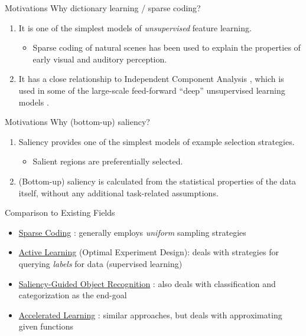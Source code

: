 \documentclass{beamer}
\begin{document}
\begin{frame}{Motivations}
Why dictionary learning / sparse coding?

\begin{enumerate}
	\item It is one of the simplest models of \emph{unsupervised} feature learning.
\begin{itemize}
	\item Sparse coding of natural scenes has been used to explain the properties of early visual \citep{Olshausen:1996p2797} and auditory \citep{Lewicki:2002p1732} perception.
\end{itemize}

	\item It has a close relationship to Independent Component Analysis \citep{Olshausen:1996p2797}, which is used in some of the large-scale feed-forward ``deep'' unsupervised learning models \citep{Le:2011td}.
\end{enumerate}

\end{frame}

\begin{frame}{Motivations}
Why (bottom-up) saliency?

\begin{enumerate}
	\item Saliency provides one of the simplest models of example selection strategies.

	\begin{itemize}
	\item Salient regions are preferentially selected.
\end{itemize}

	\item (Bottom-up) saliency is calculated from the statistical properties of the data itself, without any additional task-related assumptions.
\end{enumerate}
\end{frame}

\begin{frame}{Comparison to Existing Fields}

\begin{itemize}

	\item \underline{Sparse Coding} \citep{Olshausen:1996p2797,Lewicki:2002p1732}: generally employs \emph{uniform} sampling strategies

	\item \underline{Active Learning} (Optimal Experiment Design): deals with strategies for querying \emph{labels} for data (supervised learning) \citep{Settles:2010vo}

	\item \underline{Saliency-Guided Object Recognition} \citep{Zhu:2012ti,Kanan:2010to}: also deals with classification and categorization as the end-goal

	\item \underline{Accelerated Learning} \citep{Zhang:1994uy,Plutowski:1996vv}: similar approaches, but deals with approximating given functions


\end{itemize}

\end{frame}
\end{document}
